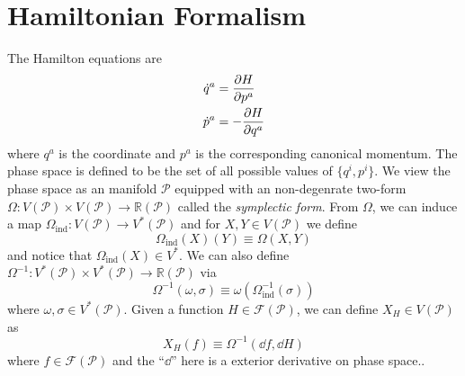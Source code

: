 \documentclass[10pt]{article}
\begin{document}
\section{Hamiltonian Formalism}
The Hamilton equations are
\begin{subequations}
    \begin{align}
        \dot{q}^a & =\pdv{H}{p^a}  \\
        \dot{p}^a & =-\pdv{H}{q^a}
    \end{align}
\end{subequations}
where $q^a$ is the coordinate and $p^a$ is the corresponding canonical momentum.
The phase space is defined to be the set of all possible values of $\{q^i,p^i\}$.
We view the phase space as an manifold $\mathcal{P}$ equipped with an non-degenrate two-form $\Omega:V(\mathcal{P})\times V(\mathcal{P})\to\mathbb{R}(\mathcal{P})$ called the \textit{symplectic form}.
From $\Omega$, we can induce a map $\Omega_{\text{ind}}:V(\mathcal{P})\to V^\ast(\mathcal{P})$ and for $X,Y\in V(\mathcal{P})$ we define
\begin{equation}
    \Omega_{\text{ind}}(X)(Y)\equiv\Omega(X,Y)
\end{equation}
and notice that $\Omega_{\text{ind}}(X)\in V^\ast$.
We can also define $\Omega^{-1}:V^\ast(\mathcal{P})\times V^\ast(\mathcal{P})\to \mathbb{R}(\mathcal{P})$ via
\begin{equation}
    \Omega^{-1}(\omega,\sigma)\equiv\omega(\Omega_{\text{ind}}^{-1}(\sigma))
\end{equation}
where $\omega,\sigma\in V^\ast(\mathcal{P})$.
Given a function $H\in\mathcal{F}(\mathcal{P})$, we can define $X_H\in V(\mathcal{P})$ as
\begin{equation}
    X_H(f)\equiv\Omega^{-1}(\dd{f},\dd{H})
\end{equation}
where $f\in\mathcal{F}(\mathcal{P})$ and the ``$\dd$'' here is a exterior derivative on phase space..
\end{document}
